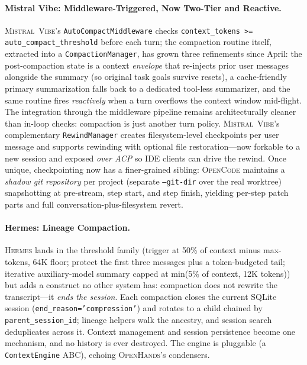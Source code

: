\documentclass[11pt,a4paper]{article}
\newcommand{\oh}{\textsc{OpenHands}\xspace}
\newcommand{\vibe}{\textsc{Mistral~Vibe}\xspace}
\newcommand{\hrm}{\textsc{Hermes}\xspace}
\newcommand{\ocd}{\textsc{OpenCode}\xspace}
\begin{document}
\paragraph{Mistral Vibe: Middleware-Triggered, Now Two-Tier and Reactive.}
\vibe{}'s \texttt{AutoCompactMiddleware} checks \texttt{context\_tokens >= auto\_compact\_threshold} before each turn; the compaction routine itself, extracted into a \texttt{CompactionManager}, has grown three refinements since April: the post-compaction state is a context \emph{envelope} that re-injects prior user messages alongside the summary (so original task goals survive resets), a cache-friendly primary summarization falls back to a dedicated tool-less summarizer, and the same routine fires \emph{reactively} when a turn overflows the context window mid-flight.
The integration through the middleware pipeline remains architecturally cleaner than in-loop checks: compaction is just another turn policy.
\vibe{}'s complementary \texttt{RewindManager} creates filesystem-level checkpoints per user message and supports rewinding with optional file restoration---now forkable to a new session and exposed \emph{over ACP} so IDE clients can drive the rewind.
Once unique, checkpointing now has a finer-grained sibling: \ocd{} maintains a \emph{shadow git repository} per project (separate \texttt{--git-dir} over the real worktree) snapshotting at pre-stream, step start, and step finish, yielding per-step patch parts and full conversation-plus-filesystem revert.

\paragraph{Hermes: Lineage Compaction.}
\hrm{} lands in the threshold family (trigger at 50\% of context minus max-tokens, 64K floor; protect the first three messages plus a token-budgeted tail; iterative auxiliary-model summary capped at min(5\% of context, 12K tokens)) but adds a construct no other system has: compaction does not rewrite the transcript---it \emph{ends the session}.
Each compaction closes the current SQLite session (\texttt{end\_reason='compression'}) and rotates to a child chained by \texttt{parent\_session\_id}; lineage helpers walk the ancestry, and session search deduplicates across it.
Context management and session persistence become one mechanism, and no history is ever destroyed.
The engine is pluggable (a \texttt{ContextEngine} ABC), echoing \oh{}'s condensers.
\end{document}
